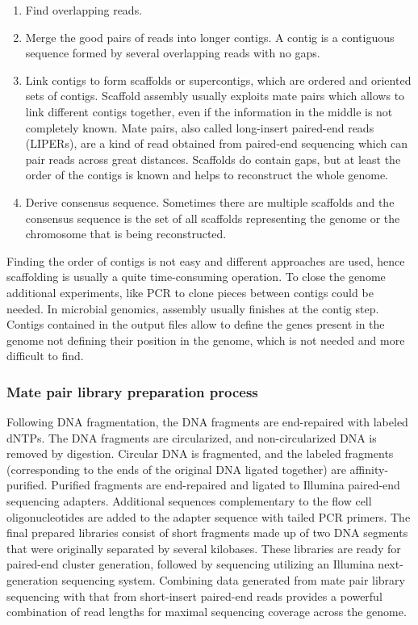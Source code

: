     \begin{multicols}{2}
        \begin{enumerate}
            \item Find overlapping reads.
            \item Merge the good pairs of reads into longer contigs.
                A contig is a contiguous sequence formed by several overlapping reads with no gaps.
            \item Link contigs to form scaffolds or supercontigs, which are ordered and oriented sets of contigs.
                Scaffold assembly usually exploits mate pairs which allows to link different contigs together, even if the information in the middle is not completely known.
                Mate pairs, also called long-insert paired-end reads (LIPERs), are a kind of read obtained from paired-end sequencing which can pair reads across great distances.
                Scaffolds do contain gaps, but at least the order of the contigs is known and helps to reconstruct the whole genome.
            \item Derive consensus sequence.
                Sometimes there are multiple scaffolds and the consensus sequence is the set of all scaffolds representing the genome or the chromosome that is being reconstructed.
        \end{enumerate}
    \end{multicols}

    Finding the order of contigs is not easy and different approaches are used, hence scaffolding is usually a quite time-consuming operation.
    To close the genome additional experiments, like PCR to clone pieces between contigs could be needed.
    In microbial genomics, assembly usually finishes at the contig step.
    Contigs contained in the output files allow to define the genes present in the genome not defining their position in the genome, which is not needed and more difficult to find.

        \subsubsection{Mate pair library preparation process}
        Following DNA fragmentation, the DNA fragments are end-repaired with labeled dNTPs.
        The DNA fragments are circularized, and non-circularized DNA is removed by digestion.
        Circular DNA is fragmented, and the labeled fragments (corresponding to the ends of the original DNA ligated together) are affinity-purified.
        Purified fragments are end-repaired and ligated to Illumina paired-end sequencing adapters.
        Additional sequences complementary to the flow cell oligonucleotides are added to the adapter sequence with tailed PCR primers.
        The final prepared libraries consist of short fragments made up of two DNA segments that were originally separated by several kilobases.
        These libraries are ready for paired-end cluster generation, followed by sequencing utilizing an Illumina next-generation sequencing system.
        Combining data generated from mate pair library sequencing with that from short-insert paired-end reads provides a powerful combination of read lengths for maximal sequencing coverage across the genome.

